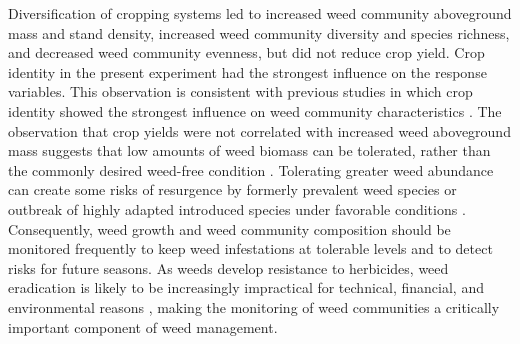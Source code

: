 \documentclass[
]{article}
\begin{document}
Diversification of cropping systems led to increased weed community aboveground mass and stand density, increased weed community diversity and species richness, and decreased weed community evenness, but did not reduce crop yield. Crop identity in the present experiment had the strongest influence on the response variables. This observation is consistent with previous studies in which crop identity showed the strongest influence on weed community characteristics \citep{legereDiversityAssemblyWeed2005, smithAssemblyWeedCommunities2007}. The observation that crop yields were not correlated with increased weed aboveground mass suggests that low amounts of weed biomass can be tolerated, rather than the commonly desired weed-free condition \citep{zimdahlNeedHistoricalPerspective2012}. Tolerating greater weed abundance can create some risks of resurgence by formerly prevalent weed species or outbreak of highly adapted introduced species under favorable conditions \citep{mohlerWeedEvolutionCommunity2001}. Consequently, weed growth and weed community composition should be monitored frequently to keep weed infestations at tolerable levels and to detect risks for future seasons. As weeds develop resistance to herbicides, weed eradication is likely to be increasingly impractical for technical, financial, and environmental reasons \citep{brookesKeyEnvironmentalImpacts2013, stewartWeedControlEnvironmental2011}, making the monitoring of weed communities a critically important component of weed management.
\end{document}
